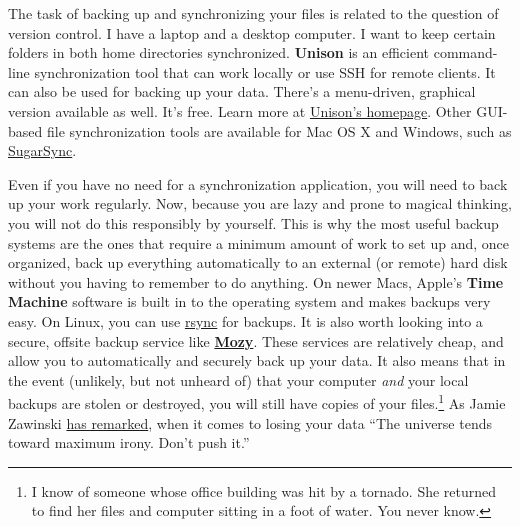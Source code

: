 \documentclass[11pt,article,oneside]{memoir}
\begin{document}
The task of backing up and synchronizing your files is related to the question of version control. I have a laptop and a desktop computer. I want to keep certain folders in both home directories synchronized. \textbf{Unison} is an efficient command-line synchronization tool that can work locally or use SSH for remote clients. It can also be used for backing up your data. There's a menu-driven, graphical version available as well. It's free. Learn more at \href{http://www.cis.upenn.edu/~bcpierce/unison/}{Unison's homepage}. Other GUI-based file synchronization tools are available for Mac OS X and Windows, such as \href{http://www.sugarsync.com/}{SugarSync}. 

Even if you have no need for a synchronization application, you will need to back up your work regularly. Now, because you are lazy and prone to magical thinking, you will not do this responsibly by yourself. This is why the most useful backup systems are the ones that require a minimum amount of work to set up and, once organized, back up everything automatically to an external (or remote) hard disk without you having to remember to do anything. On newer Macs, Apple's \textbf{Time Machine} software is built in to the operating system and makes backups very easy. On Linux, you can use \href{http://www.psychocats.net/ubuntu/backup}{rsync} for backups. It is also  worth looking into a secure, offsite backup service like \href{http://mozy.com/}{\textbf{Mozy}}. These services are relatively cheap, and allow you to automatically and securely back up your data. It also means that in the event (unlikely, but not unheard of) that your computer \emph{and} your local backups are stolen or destroyed, you will still have copies of your files.\footnote{I know of someone whose office building was hit by a tornado. She returned to find her files and computer sitting in a foot of water. You never know.} As Jamie Zawinski \href{http://jwz.livejournal.com/801607.html}{has remarked}, when it comes to losing your data ``The universe tends toward maximum irony. Don't push it.''
\end{document}
